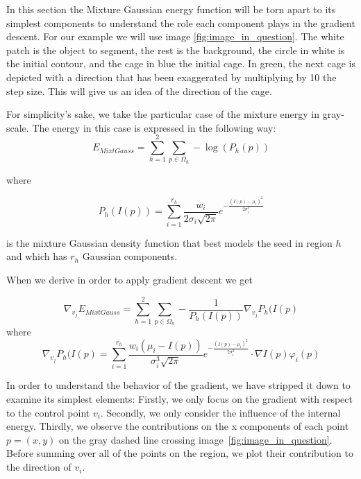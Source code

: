 In this section the Mixture Gaussian energy function will be torn apart to its simplest components to understand the role each component plays in the gradient descent. For our example we will use image \ref{fig:image_in_question}. The white patch is the object to segment, the rest is the background, the circle in white is the initial contour, and the cage in blue the initial cage. In green, the next cage is depicted with a direction that has been exaggerated by multiplying by 10 the step size. This will give us an idea of the direction of the cage. 

For simplicity's sake, we take the particular case of the mixture energy in gray-scale. The energy in this case is expressed in the following way:
\begin{equation}
E_{MixtGauss} = \sum\limits_{h =1}^{2} \sum\limits_{p \in \Omega_h}-\log(P_h(p))
\end{equation}

where

\begin{equation}\label{eq:gme_density_descript}
P_h(I(p))=\sum\limits_{i=1}^{r_h}\frac{w_i}{2\sigma_i\sqrt{2\pi}}e^{-\frac{(I(p)-\mu_i)^2}{2\sigma_i^2}}
\end{equation}

is the mixture Gaussian density function that best models the seed in region $h$ and which has $r_h$ Gaussian components.

When we derive in order to apply gradient descent we get

\begin{equation}\label{eq:gme_descript}
\nabla_{v_j}E_{MixtGauss} =\sum\limits_{h =1}^{2} \sum\limits_{p \in \Omega_h} -\frac{1}{P_h(I(p))}\nabla_{v_j} P_h(I(p)
\end{equation}
where
\begin{equation}\label{eq:mixture_gradient_descript}
\nabla_{v_j} P_h(I(p)= \sum\limits_{i=1}^{r_h}\frac{w_i(\mu_i-I(p))}{\sigma_i^3\sqrt{2\pi}}e^{-\frac{(I(p)-\mu_i)^2}{2\sigma_i^2}}\cdot \nabla I(p) \varphi_i(p)
\end{equation}

In order to understand the behavior of the gradient, we have stripped it down to examine its simplest elements:
Firstly, we only focus on the gradient with respect to the control point $v_i$. Secondly, we only consider the influence of the internal energy. Thirdly, we observe the contributions on the x components of each point $p=(x,y)$ on the gray dashed line crossing image~\ref{fig:image_in_question}. Before summing over all of the points on the region, we plot their contribution to the direction of $v_i$.


